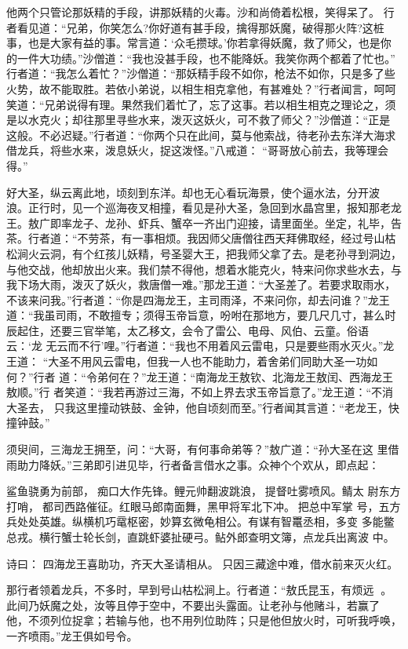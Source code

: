 他两个只管论那妖精的手段，讲那妖精的火毒。沙和尚倚着松根，笑得呆了。
行者看见道：“兄弟，你笑怎么?你好道有甚手段，擒得那妖魔，破得那火阵?这桩
事，也是大家有益的事。常言道：‘众毛攒球。’你若拿得妖魔，救了师父，也是你
的一件大功绩。”沙僧道：“我也没甚手段，也不能降妖。我笑你两个都着了忙也。”
行者道：“我怎么着忙？”沙僧道：“那妖精手段不如你，枪法不如你，只是多了些
火势，故不能取胜。若依小弟说，以相生相克拿他，有甚难处？”行者闻言，呵呵
笑道：“兄弟说得有理。果然我们着忙了，忘了这事。若以相生相克之理论之，须
是以水克火；却往那里寻些水来，泼灭这妖火，可不救了师父？”沙僧道：“正是
这般。不必迟疑。”行者道：“你两个只在此间，莫与他索战，待老孙去东洋大海求
借龙兵，将些水来，泼息妖火，捉这泼怪。”八戒道：
“哥哥放心前去，我等理会得。”

好大圣，纵云离此地，顷刻到东洋。却也无心看玩海景，使个逼水法，分开波
浪。正行时，见一个巡海夜叉相撞，看见是孙大圣，急回到水晶宫里，报知那老龙
王。敖广即率龙子、龙孙、虾兵、蟹卒一齐出门迎接，请里面坐。坐定，礼毕，告
茶。行者道：“不劳茶，有一事相烦。我因师父唐僧往西天拜佛取经，经过号山枯
松涧火云洞，有个红孩儿妖精，号圣婴大王，把我师父拿了去。是老孙寻到洞边，
与他交战，他却放出火来。我们禁不得他，想着水能克火，特来问你求些水去，与
我下场大雨，泼灭了妖火，救唐僧一难。”那龙王道：“大圣差了。若要求取雨水，
不该来问我。”行者道：“你是四海龙王，主司雨泽，不来问你，却去问谁？”龙王
道：“我虽司雨，不敢擅专；须得玉帝旨意，吩咐在那地方，要几尺几寸，甚么时
辰起住，还要三官举笔，太乙移文，会令了雷公、电母、风伯、云童。俗语云：‘龙
无云而不行’哩。”行者道：“我也不用着风云雷电，只是要些雨水灭火。”龙王道：
“大圣不用风云雷电，但我一人也不能助力，着舍弟们同助大圣一功如何？”行者
道：“令弟何在？”龙王道：“南海龙王敖钦、北海龙王敖闰、西海龙王敖顺。”行
者笑道：“我若再游过三海，不如上界去求玉帝旨意了。”龙王道：“不消大圣去，
只我这里撞动铁鼓、金钟，他自顷刻而至。”行者闻其言道：“老龙王，快撞钟鼓。”

须臾间，三海龙王拥至，问：“大哥，有何事命弟等？”敖广道：“孙大圣在这
里借雨助力降妖。”三弟即引进见毕，行者备言借水之事。众神个个欢从，即点起：

鲨鱼骁勇为前部，痴口大作先锋。鲤元帅翻波跳浪，提督吐雾喷风。鲭太
尉东方打哨，都司西路催征。红眼马郎南面舞，黑甲将军北下冲。把总中军掌
号，五方兵处处英雄。纵横机巧鼋枢密，妙算玄微龟相公。有谋有智鼍丞相，多变
多能鳖总戎。横行蟹士轮长剑，直跳虾婆扯硬弓。鲇外郎查明文簿，点龙兵出离波
中。

诗曰：
四海龙王喜助功，齐天大圣请相从。
只因三藏途中难，借水前来灭火红。

那行者领着龙兵，不多时，早到号山枯松涧上。行者道：“敖氏昆玉，有烦远
。此间乃妖魔之处，汝等且停于空中，不要出头露面。让老孙与他赌斗，若赢了
他，不须列位捉拿；若输与他，也不用列位助阵；只是他但放火时，可听我呼唤，
一齐喷雨。”龙王俱如号令。

